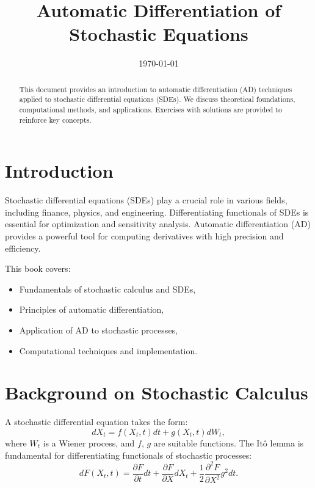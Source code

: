 \documentclass{article}
\title{Automatic Differentiation of Stochastic Equations}
\author{}
\date{\today}
\begin{document}
	
	\maketitle
	
	\begin{abstract}
		This document provides an introduction to automatic differentiation (AD) techniques applied to stochastic differential equations (SDEs). We discuss theoretical foundations, computational methods, and applications. Exercises with solutions are provided to reinforce key concepts.
	\end{abstract}
	
	\section{Introduction}
	Stochastic differential equations (SDEs) play a crucial role in various fields, including finance, physics, and engineering. Differentiating functionals of SDEs is essential for optimization and sensitivity analysis. Automatic differentiation (AD) provides a powerful tool for computing derivatives with high precision and efficiency.
	
	This book covers:
	\begin{itemize}
		\item Fundamentals of stochastic calculus and SDEs,
		\item Principles of automatic differentiation,
		\item Application of AD to stochastic processes,
		\item Computational techniques and implementation.
	\end{itemize}
	
	\section{Background on Stochastic Calculus}
	A stochastic differential equation takes the form:
	\begin{equation}
		dX_t = f(X_t, t) dt + g(X_t, t) dW_t,
	\end{equation}
	where $W_t$ is a Wiener process, and $f$, $g$ are suitable functions. The It\^o lemma is fundamental for differentiating functionals of stochastic processes:
	\begin{equation}
		dF(X_t, t) = \frac{\partial F}{\partial t} dt + \frac{\partial F}{\partial X} dX_t + \frac{1}{2} \frac{\partial^2 F}{\partial X^2} g^2 dt.
	\end{equation}
	
\end{document}
